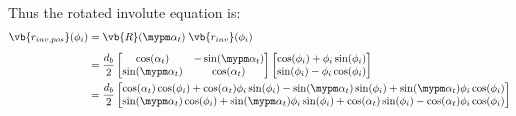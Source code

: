 Thus the rotated involute equation is:
\begin{subequations}
\begin{align}
    \vb{r_{inv,pos}}(\phi_i) &= \vb{R}(\mypm\alpha_t)\;\vb{r_{inv}}(\phi_i) \\[1ex]
    &=  \frac{d_b}{2} \begin{bmatrix}
            \cos(\alpha_t) & -\sin(\mypm\alpha_t) \\
            \sin(\mypm\alpha_t) & \cos(\alpha_t)
        \end{bmatrix}
        \begin{bmatrix}
            \cos(\phi_i) + \phi_i\sin(\phi_i)\\
            \sin(\phi_i) -\phi_i \cos(\phi_i)
        \end{bmatrix}
\\
    &=  \frac{d_b}{2}\begin{bmatrix}
            \cos(\alpha_t)\cos(\phi_i) +\cos(\alpha_t)\phi_i\sin(\phi_i) -\sin(\mypm\alpha_t)\sin(\phi_i) +\sin(\mypm\alpha_t)\phi_i\cos(\phi_i) \\
            \sin(\mypm\alpha_t)\cos(\phi_i) +\sin(\mypm\alpha_t)\phi_i\sin(\phi_i) + \cos(\alpha_t)\sin(\phi_i) -\cos(\alpha_t)\phi_i\cos(\phi_i) \\
        \end{bmatrix}
\end{align}
\end{subequations}

